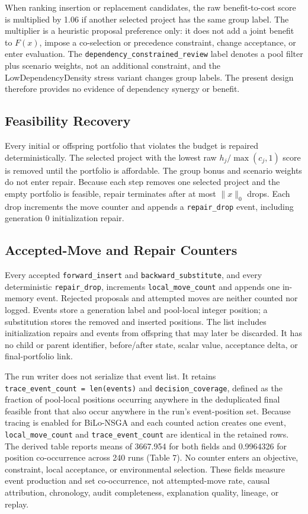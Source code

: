 \documentclass[applsci,article,submit,moreauthors]{Definitions/mdpi}
\begin{document}
When ranking insertion or replacement candidates, the raw benefit-to-cost score is multiplied by 1.06 if another selected project has the same group label. The multiplier is a heuristic proposal preference only: it does not add a joint benefit to \(F(x)\), impose a co-selection or precedence constraint, change acceptance, or enter evaluation. The \texttt{dependency\_constrained\_review} label denotes a pool filter plus scenario weights, not an additional constraint, and the LowDependencyDensity stress variant changes group labels. The present design therefore provides no evidence of dependency synergy or benefit.

\subsection{Feasibility Recovery}\label{feasibility-recovery}

Every initial or offspring portfolio that violates the budget is repaired deterministically. The selected project with the lowest raw \(h_j/\max(c_j,1)\) score is removed until the portfolio is affordable. The group bonus and scenario weights do not enter repair. Because each step removes one selected project and the empty portfolio is feasible, repair terminates after at most \(\|x\|_0\) drops. Each drop increments the move counter and appends a \texttt{repair\_drop} event, including generation 0 initialization repair.

\subsection{Accepted-Move and Repair Counters}\label{accepted-move-and-repair-counters}

Every accepted \texttt{forward\_insert} and \texttt{backward\_substitute}, and every deterministic \texttt{repair\_drop}, increments \texttt{local\_move\_count} and appends one in-memory event. Rejected proposals and attempted moves are neither counted nor logged. Events store a generation label and pool-local integer position; a substitution stores the removed and inserted positions. The list includes initialization repairs and events from offspring that may later be discarded. It has no child or parent identifier, before/after state, scalar value, acceptance delta, or final-portfolio link.

The run writer does not serialize that event list. It retains \texttt{trace\_event\_count\ =\ len(events)} and \texttt{decision\_coverage}, defined as the fraction of pool-local positions occurring anywhere in the deduplicated final feasible front that also occur anywhere in the run's event-position set. Because tracing is enabled for BiLo-NSGA and each counted action creates one event, \texttt{local\_move\_count} and \texttt{trace\_event\_count} are identical in the retained rows. The derived table reports means of 3667.954 for both fields and 0.9964326 for position co-occurrence across 240 runs (Table 7). No counter enters an objective, constraint, local acceptance, or environmental selection. These fields measure event production and set co-occurrence, not attempted-move rate, causal attribution, chronology, audit completeness, explanation quality, lineage, or replay.
\end{document}
